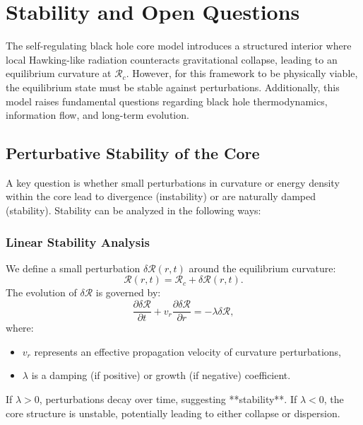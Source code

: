 \section{Stability and Open Questions}
\label{sec:stability}

The self-regulating black hole core model introduces a structured interior where local Hawking-like radiation counteracts gravitational collapse, leading to an equilibrium curvature at \( \mathcal{R}_c \). However, for this framework to be physically viable, the equilibrium state must be stable against perturbations. Additionally, this model raises fundamental questions regarding black hole thermodynamics, information flow, and long-term evolution.

\subsection{Perturbative Stability of the Core}
A key question is whether small perturbations in curvature or energy density within the core lead to divergence (instability) or are naturally damped (stability). Stability can be analyzed in the following ways:

\subsubsection{Linear Stability Analysis}
We define a small perturbation \( \delta \mathcal{R}(r,t) \) around the equilibrium curvature:
\begin{equation}
    \mathcal{R}(r,t) = \mathcal{R}_c + \delta \mathcal{R}(r,t).
\end{equation}
The evolution of \( \delta \mathcal{R} \) is governed by:
\begin{equation}
    \frac{\partial \delta \mathcal{R}}{\partial t} + v_r \frac{\partial \delta \mathcal{R}}{\partial r} = -\lambda \delta \mathcal{R},
\end{equation}
where:
\begin{itemize}
    \item \( v_r \) represents an effective propagation velocity of curvature perturbations,
    \item \( \lambda \) is a damping (if positive) or growth (if negative) coefficient.
\end{itemize}

If \( \lambda > 0 \), perturbations decay over time, suggesting **stability**. If \( \lambda < 0 \), the core structure is unstable, potentially leading to either collapse or dispersion.

